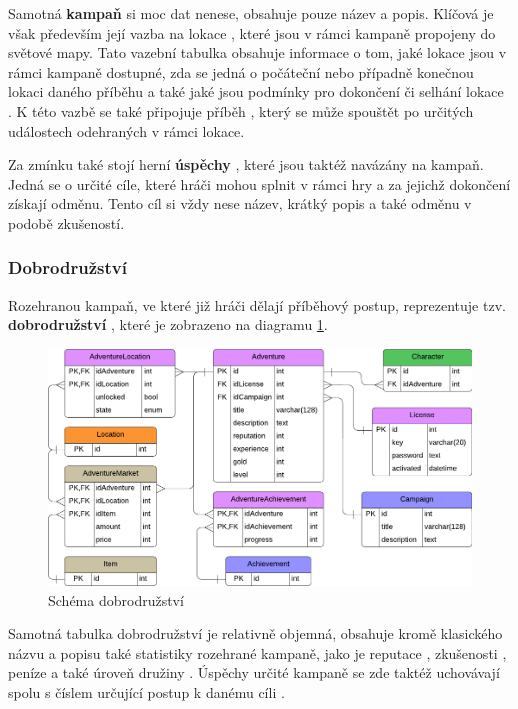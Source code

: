 Samotná \textbf{kampaň}  si moc dat nenese, obsahuje pouze název a popis. Klíčová je však především její vazba na lokace , které jsou v rámci kampaně propojeny do světové mapy. Tato vazební tabulka obsahuje informace o tom, jaké lokace jsou v rámci kampaně dostupné, zda se jedná o počáteční  nebo případně konečnou  lokaci daného příběhu a také jaké jsou podmínky pro dokončení či selhání lokace . K této vazbě se také připojuje příběh , který se může spouštět po určitých událostech odehraných v rámci lokace.

Za zmínku také stojí herní \textbf{úspěchy} , které jsou taktéž navázány na kampaň. Jedná se o určité cíle, které hráči mohou splnit v rámci hry a za jejichž dokončení získají odměnu. Tento cíl si vždy nese název, krátký popis a také odměnu v podobě zkušeností.


\subsubsection*{Dobrodružství}
\label{subsubsec:schema_adventure}

Rozehranou kampaň, ve které již hráči dělají příběhový postup, reprezentuje tzv. \textbf{dobrodružství} , které je zobrazeno na diagramu \ref{diag:er_adventure}.

\begin{figure}[h]
    \centering
    \includegraphics[scale=0.8]{../../shared/diagrams/er_adventure.pdf}
    \caption{Schéma dobrodružství}
    \label{diag:er_adventure}
\end{figure}

Samotná tabulka dobrodružství je relativně objemná, obsahuje kromě klasického názvu a popisu také statistiky rozehrané kampaně, jako je reputace , zkušenosti , peníze  a také úroveň družiny . Úspěchy určité kampaně  se zde taktéž uchovávají spolu s číslem určující postup k danému cíli .

